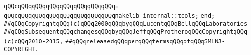 \verb|qQQqqQQqqQQqqQQqqQQqqQQqqQQqqQQq=|\newline
\verb|qQQqqQQqqQQqqQQqqQQqqQQqqQQqqQQqmakelib_internal::tools;|\newline
\verb|end;|\newline
\newline
\newline
\verb|##qQQqCopyrightqQQq(c)qQQq2000qQQqbyqQQqLucentqQQqBellqQQqLaboratories|\newline
\verb|##qQQqSubsequentqQQqchangesqQQqbyqQQqJeffqQQqProtheroqQQqCopyrightqQQq(c)qQQq2010-2015,|\newline
\verb|##qQQqreleasedqQQqperqQQqtermsqQQqofqQQqSMLNJ-COPYRIGHT.|\newline

